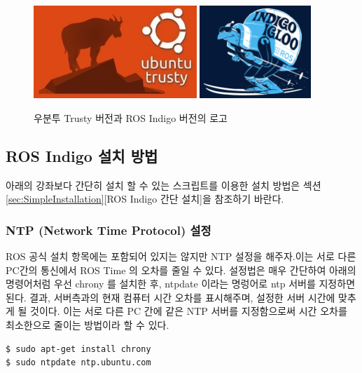 \begin{figure}[h]
\centering\includegraphics[height=35mm]{pictures/chapter2/ubuntu_14_04.jpg}
\centering\includegraphics[height=35mm]{pictures/chapter2/indigo_igloo.png}
\caption{우분투 Trusty 버전과 ROS Indigo 버전의 로고}
\end{figure}

\subsection{ROS Indigo 설치 방법}
\label{sec:ROSInstallation}

\begin{exercise}[간단 설치]
아래의 강좌보다 간단히 설치 할 수 있는 스크립트를 이용한 설치 방법은 섹션\ref{sec:SimpleInstallation}[ROS Indigo 간단 설치]을 참조하기 바란다.\\
\end{exercise}

\subsubsection{NTP (Network Time Protocol) 설정}
ROS 공식 설치 항목에는 포함되어 있지는 않지만 NTP 설정을 해주자.이는 서로 다른 PC간의 통신에서 ROS Time 의 오차를 줄일 수 있다. 설정법은 매우 간단하여 아래의 명령어처럼 우선 chrony 를 설치한 후, ntpdate 이라는 명렁어로 ntp 서버를 지정하면 된다. 결과, 서버측과의 현재 컴퓨터 시간 오차를 표시해주며, 설정한 서버 시간에 맞추게 될 것이다. 이는 서로 다른 PC 간에 같은 NTP 서버를 지정함으로써 시간 오차를 최소한으로 줄이는 방법이라 할 수 있다.
\\
\begin{lstlisting}[language=ROS]
$ sudo apt-get install chrony
$ sudo ntpdate ntp.ubuntu.com
\end{lstlisting}

